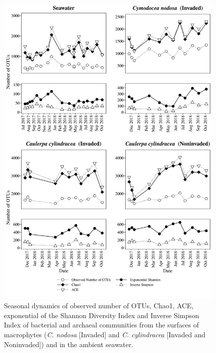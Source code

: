 \documentclass[12pt,]{article}
\begin{document}
\begin{figure}[H]

{\centering \includegraphics[width=0.85\linewidth]{../results/figures/calculators} 

}

\caption{Seasonal dynamics of observed number of OTUs, Chao1, ACE, exponential of the Shannon Diversity Index and Inverse Simpson Index of bacterial and archaeal communities from the surfaces of macrophytes (\textit{C. nodosa} [Invaded] and \textit{C. cylindracea} [Invaded and Noninvaded]) and in the ambient seawater.\label{calculators}}\label{fig:unnamed-chunk-2}
\end{figure}
\end{document}
